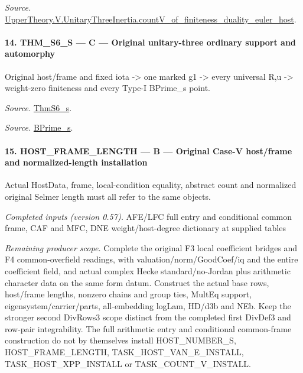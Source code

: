 \documentclass[11pt,a4paper]{article}
\numberwithin{equation}{section}
\theoremstyle{remark}\newtheorem{remark}[theorem]{Remark}
\begin{document}
\emph{Source.} \href{https://github.com/CocoSgt/riemann-hypothesis-lean/blob/7cbf7a0c32fca1badf05931879a37c3f8a2b03b4/src/Development/AutomorphicArithmetic/AutomorphicVarieties/ModularityArgument/ThresholdArguments/DenseThresholdCases/CountVOf.lean#L33-L60}{UpperTheory.V.UnitaryThreeInertia.countV\_\allowbreak of\_\allowbreak finiteness\_\allowbreak duality\_\allowbreak euler\_\allowbreak host}.



\paragraph{14. THM\_\allowbreak S6\_\allowbreak S — C — Original unitary-three ordinary support and automorphy}

Original host/frame and fixed iota -> one marked g1 -> every universal R,u -> weight-zero finiteness and every Type-I BPrime\_\allowbreak s point.

\emph{Source.} \href{https://github.com/CocoSgt/riemann-hypothesis-lean/blob/7cbf7a0c32fca1badf05931879a37c3f8a2b03b4/src/Development/AutomorphicArithmetic/AutomorphicVarieties/ModularityArgument/ThresholdArguments/DenseThresholdCases/ThmS6CoreS.lean#L17-L26}{ThmS6\_\allowbreak s}.

\emph{Source.} \href{https://github.com/CocoSgt/riemann-hypothesis-lean/blob/7cbf7a0c32fca1badf05931879a37c3f8a2b03b4/src/Development/AutomorphicArithmetic/AutomorphicVarieties/ModularityArgument/ThresholdArguments/DenseThresholdCases/ThmS6CoreS.lean#L12-L16}{BPrime\_\allowbreak s}.



\paragraph{15. HOST\_\allowbreak FRAME\_\allowbreak LENGTH — B — Original Case-V host/frame and normalized-length installation}

Actual HostData, frame, local-condition equality, abstract count and normalized original Selmer length must all refer to the same objects.

\emph{Completed inputs (version 0.57).} AFE/LFC full entry and conditional common frame, CAF and MFC, DNE weight/host-degree dictionary at supplied tables

\emph{Remaining producer scope.} Complete the original F3 local coefficient bridges and F4 common-overfield readings, with valuation/norm/GoodCoef/iq and the entire coefficient field, and actual complex Hecke standard/no-Jordan plus arithmetic character data on the same form datum. Construct the actual base rows, host/frame lengths, nonzero chains and group ties, MultEq support, eigensystem/carrier/parts, all-embedding logLam, HD/d3b and NEb. Keep the stronger second DivRows3 scope distinct from the completed first DivDef3 and row-pair integrability. The full arithmetic entry and conditional common-frame construction do not by themselves install HOST\_\allowbreak NUMBER\_\allowbreak S, HOST\_\allowbreak FRAME\_\allowbreak LENGTH, TASK\_\allowbreak HOST\_\allowbreak VAN\_\allowbreak E\_\allowbreak INSTALL, TASK\_\allowbreak HOST\_\allowbreak XPP\_\allowbreak INSTALL or TASK\_\allowbreak COUNT\_\allowbreak V\_\allowbreak INSTALL.
\end{document}
